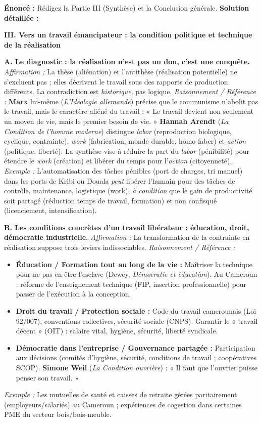 \documentclass[11pt]{article}
\newcommand{\cle}[1]{{\popxbold\color{popdark}#1}}
\begin{document}
\begin{exoresolu}
\textbf{Énoncé :} Rédigez la Partie III (Synthèse) et la Conclusion générale.
\tcblower
\textbf{Solution détaillée :}

\textbf{III. Vers un travail émancipateur : la condition politique et technique de la réalisation}

\textbf{A. Le diagnostic : la réalisation n'est pas un don, c'est une conquête.}
\textit{Affirmation :} La thèse (aliénation) et l'antithèse (réalisation potentielle) ne s'excluent pas ; elles décrivent le travail sous des rapports de production différents. La contradiction est \emph{historique}, pas logique.
\textit{Raisonnement / Référence :} \textbf{Marx} lui-même (\emph{L'Idéologie allemande}) précise que le communisme n'abolit pas le travail, mais le \cle{caractère aliéné} du travail : « Le travail devient non seulement un moyen de vie, mais le premier besoin de vie. » \textbf{Hannah Arendt} (\emph{La Condition de l'homme moderne}) distingue \emph{labor} (reproduction biologique, cyclique, contrainte), \emph{work} (fabrication, monde durable, homo faber) et \emph{action} (politique, liberté). La synthèse vise à réduire la part du \emph{labor} (pénibilité) pour étendre le \emph{work} (création) et libérer du temps pour l'\emph{action} (citoyenneté).
\textit{Exemple :} L'automatisation des tâches pénibles (port de charges, tri manuel) dans les ports de Kribi ou Douala \emph{peut} libérer l'humain pour des tâches de contrôle, maintenance, logistique (work), \emph{à condition} que le gain de productivité soit partagé (réduction temps de travail, formation) et non confisqué (licenciement, intensification).

\textbf{B. Les conditions concrètes d'un travail libérateur : éducation, droit, démocratie industrielle.}
\textit{Affirmation :} La transformation de la contrainte en réalisation suppose trois leviers indissociables.
\textit{Raisonnement / Référence :}
\begin{itemize}
    \item \textbf{Éducation / Formation tout au long de la vie :} Maîtriser la technique pour ne pas en être l'esclave (Dewey, \emph{Démocratie et éducation}). Au Cameroun : réforme de l'enseignement technique (FIP, insertion professionnelle) pour passer de l'exécution à la conception.
    \item \textbf{Droit du travail / Protection sociale :} Code du travail camerounais (Loi 92/007), conventions collectives, sécurité sociale (CNPS). Garantir le « travail décent » (OIT) : salaire vital, hygiène, sécurité, liberté syndicale.
    \item \textbf{Démocratie dans l'entreprise / Gouvernance partagée :} Participation aux décisions (comités d'hygiène, sécurité, conditions de travail ; coopératives SCOP). \textbf{Simone Weil} (\emph{La Condition ouvrière}) : « Il faut que l'ouvrier puisse penser son travail. »
\end{itemize}
\textit{Exemple :} Les mutuelles de santé et caisses de retraite gérées paritairement (employeurs/salariés) au Cameroun ; expériences de cogestion dans certaines PME du secteur bois/bois-meuble.


\end{exoresolu}
\end{document}
